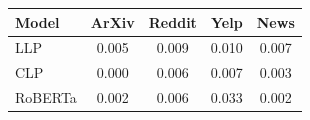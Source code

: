 \begin{tabular}{lcccc}
\toprule
\textbf{Model} & \textbf{ArXiv} & \textbf{Reddit} & \textbf{Yelp} & \textbf{News} \\
\midrule
LLP & 0.005 & 0.009 & 0.010 & 0.007 \\
CLP & 0.000 & 0.006 & 0.007 & 0.003 \\
RoBERTa & 0.002 & 0.006 & 0.033 & 0.002 \\
\bottomrule
\end{tabular}
